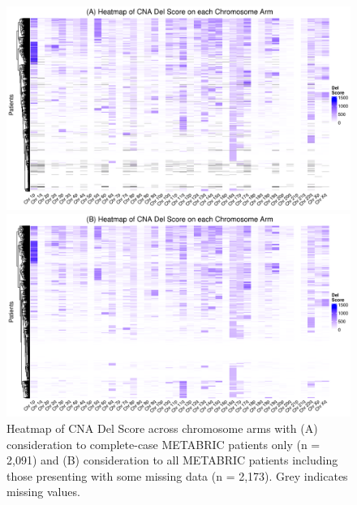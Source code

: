 \begin{figure}[!ht]
  \centering
  
  \vspace{0.8cm}
  
   \includegraphics[width = 1.05\textwidth]{../figures/Chapter_2/CNA_Del_Score_Heatmap_CCA.png}

  \vspace{1.5cm}
   
  \includegraphics[width = 1.05\textwidth]{../figures/Chapter_2/CNA_Del_Score_Heatmap_All.png}
  
  \vspace{0.8cm}
  
  \caption[Heatmap of CNA Del Score across chromosome arms.]{Heatmap of CNA Del Score across chromosome arms with (A) consideration to complete-case METABRIC patients only (n = 2,091) and (B) consideration to all METABRIC patients including those presenting with some missing data (n = 2,173). Grey indicates missing values.}
  \label{SurvTrees_Score_HM}
\end{figure}
\clearpage


